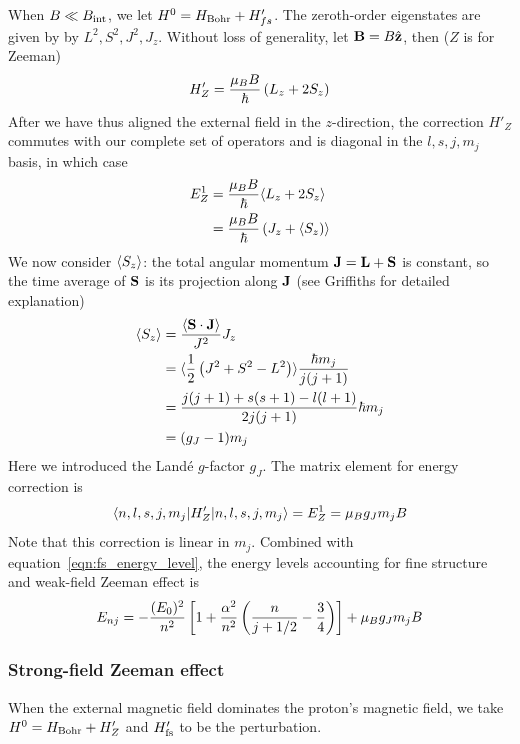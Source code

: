 When $B\ll B_{\mathrm{int}}$, we let $H^0=H_{\mathrm{Bohr}}+H'_{fs}$. The zeroth-order eigenstates are given by 
by $L^2, S^2, J^2, J_z$. Without loss of generality, let $\mathbf B = B\hat {\mathbf z}$, then ($Z$ is for Zeeman)
\begin{equation}\label{eqn:zeeman_hamiltonian}
    H'_Z = \dfrac{\mu_B B}{\hbar}\left(L_z + 2S_z\right)
\end{equation}
After we have thus aligned the external field in the $z$-direction, 
the correction $H'_Z$ commutes with our complete set of 
operators and is diagonal in the $l, s, j, m_j$ basis, in which case 
\begin{equation}\begin{aligned}
    E^1_Z &= \dfrac{\mu_B B}{\hbar}\langle L_z + 2S_z\rangle \\ 
          &= \dfrac{\mu_B B}{\hbar}\left(J_z + \langle S_z\right)\rangle 
\end{aligned}\end{equation}
We now consider $\langle S_z\rangle$: the total angular momentum $\mathbf J = \mathbf L + \mathbf S$ is constant, so the 
time average of $\mathbf S$ is its projection along $\mathbf J$ (see Griffiths for detailed explanation) 
\begin{equation}\begin{aligned}
    \langle S_z\rangle &= \dfrac{\langle \mathbf{S\cdot J}\rangle}{J^2}J_z \\ 
    &= \langle \dfrac 1 2\left(J^2 + S^2 - L^2\right)\rangle\dfrac{\hbar m_j}{j(j+1)} \\
    &= \dfrac{j(j+1)+s(s+1)-l(l+1)}{2j(j+1)}\hbar m_j \\ 
    &= (g_J-1) m_j
\end{aligned}\end{equation}
Here we introduced the Landé $g$-factor $g_J$. The matrix element for energy correction is 
\begin{equation}
    \langle n, l, s, j, m_j | H'_Z | n, l, s, j, m_j \rangle = E^1_Z = \mu_B g_J m_j B
\end{equation}
Note that this correction is linear in $m_j$. 
Combined with equation~\ref{eqn:fs_energy_level}, the energy levels accounting for fine structure and 
weak-field Zeeman effect is 
\begin{equation}
    E_{nj} = -\dfrac{(E_0)^2}{n^2}\left[1 + \dfrac{\alpha^2}{n^2}\left(\dfrac{n}{j+1/2} - \dfrac 3 4\right)\right] + \mu_B g_Jm_j B
\end{equation}

\subsubsection{Strong-field Zeeman effect}
When the external magnetic field dominates the proton's magnetic field, we take $H^0=H_{\mathrm{Bohr}}+H'_Z$ and 
$H'_{\mathrm{fs}}$ to be the perturbation. 

